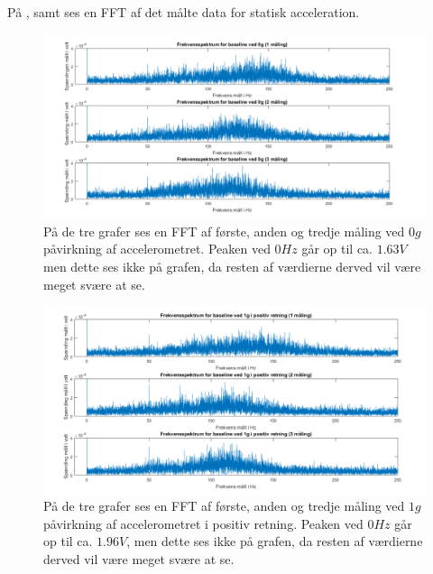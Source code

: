 På ,  samt  ses en FFT af det målte data for statisk acceleration.
\begin{figure}[H]
	\centering
	\includegraphics[scale=0.5]{figures/cProblemloesning/Pilotforsoeg_Frekvens0.png}
	\caption{På de tre grafer ses en FFT af første, anden og tredje måling ved $0g$ påvirkning af accelerometret. Peaken ved $0Hz$ går op til ca. $1.63V$ men dette ses ikke på grafen, da resten af værdierne derved vil være meget svære at se.}
	\label{Fig:Pilot_FFT0}
\end{figure}
\begin{figure}[H]
	\centering
	\includegraphics[scale=0.5]{figures/cProblemloesning/Pilotforsoeg_FrekvensP.png}
	\caption{På de tre grafer ses en FFT af første, anden og tredje måling ved $1g$ påvirkning af accelerometret i positiv retning. Peaken ved $0Hz$ går op til ca. $1.96V$, men dette ses ikke på grafen, da resten af værdierne derved vil være meget svære at se.}
	\label{Fig:Pilot_FFTP}
\end{figure}
